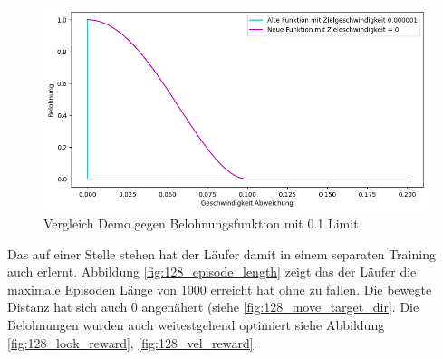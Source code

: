 \begin{figure}[H]
  \centering  
  \includegraphics[scale=0.5]{img/match_velocity_vergleich_clip}
  \caption{Vergleich Demo gegen Belohnungsfunktion mit 0.1 Limit}
  \label{fig:match_velocity_vergleich_clip}
\end{figure}
Das auf einer Stelle stehen hat der Läufer damit in einem separaten Training auch erlernt. Abbildung \ref{fig:128_episode_length} zeigt das der Läufer die maximale Episoden Länge von 1000 erreicht hat ohne zu fallen. Die bewegte Distanz hat sich auch 0 angenähert (siehe \ref{fig:128_move_target_dir}. Die Belohnungen wurden auch weitestgehend optimiert siehe Abbildung \ref{fig:128_look_reward}, \ref{fig:128_vel_reward}.


